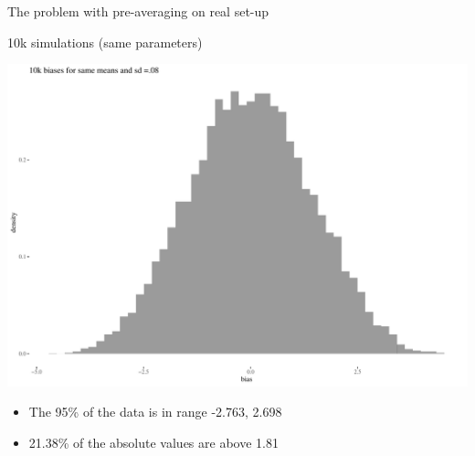 \documentclass[
  10pt,
  ignorenonframetext,
  x11names, dvipsnames, bibspacing,natbib]{beamer}
\providecommand{\tightlist}{%
  \setlength{\itemsep}{0pt}\setlength{\parskip}{0pt}}
\begin{document}
\begin{frame}{The problem with pre-averaging on real set-up}
\protect\hypertarget{the-problem-with-pre-averaging-on-real-set-up-1}{}
\begin{block}{10k simulations (same parameters)}
\protect\hypertarget{k-simulations-same-parameters}{}
\vspace{1mm}
\footnotesize

\begin{center}\includegraphics[width=0.8\linewidth]{presentationBoston_files/figure-beamer/unnamed-chunk-9-1} \end{center}
\vspace{1mm}
\footnotesize

\normalsize
\pause

\footnotesize

\vspace{-2mm}

\begin{itemize}
\tightlist
\item
  The 95\% of the data is in range -2.763, 2.698
\item
  21.38\% of the absolute values are above 1.81
\end{itemize}
\end{block}
\end{frame}
\end{document}
